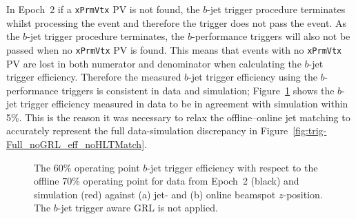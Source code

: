 In Epoch~2 if a \verb|xPrmVtx| PV is not found, the $b$-jet trigger procedure terminates whilst processing the event and therefore the trigger does not pass the event.
As the $b$-jet trigger procedure terminates, the $b$-performance triggers will also not be passed when no \verb|xPrmVtx| PV is found.
This means that events with no \verb|xPrmVtx| PV are lost in both numerator and denominator when calculating the $b$-jet trigger efficiency.
Therefore the measured $b$-jet trigger efficiency using the $b$-performance triggers is consistent in data and simulation;
Figure~\ref{fig:Epoch2_eff} shows the $b$-jet trigger efficiency measured in data to be in agreement with simulation within 5\%.
This is the reason it was necessary to relax the offline--online jet matching to accurately represent the full data-simulation discrepancy in Figure~\ref{fig:trig-Full_noGRL_eff_noHLTMatch}.

\begin{figure}[!htb]
\begin{center}
  \captionsetup[subfigure]{aboveskip=0pt,justification=centering}
\end{center}
\vspace{-1em}
\caption[
  The $b$-jet trigger efficiency 
  for data from Epoch~2 and simulation against jet-\pT{} and online beamspot $z$-position.
  The $b$-jet trigger aware GRL is not applied.]
        {
  The 60\% operating point $b$-jet trigger efficiency with respect to the offline 70\% operating point
  for data from Epoch~2 (black) and simulation (red) against (a) jet-\pT{} and (b) online beamspot $z$-position.
  The $b$-jet trigger aware GRL is not applied.}
\label{fig:Epoch2_eff}
\end{figure}


